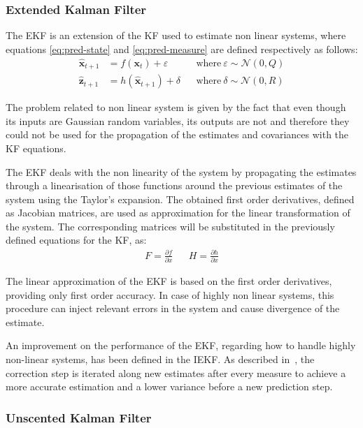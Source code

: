 \subsubsection{Extended Kalman Filter}

\noindent The \gls{EKF} is an extension of the \gls{KF} used to estimate non linear systems, where equations \eqref{eq:pred-state} and \eqref{eq:pred-measure} are defined respectively as follows:
\begin{align}
\hat{\mathbf{x}}_{t+1} & = f(\mathbf{x}_{t}) + \varepsilon &&
    \textrm{where}~\varepsilon \sim \mathcal{N}(0, Q)\\
\hat{\mathbf{z}}_{t+1} & = h(\hat{\mathbf{x}}_{t+1}) + \delta &&
    \textrm{where}~\delta \sim \mathcal{N}(0, R)
\end{align}

The problem related to non linear system is given by the fact that even though its inputs are Gaussian random variables, its outputs are not and therefore they could not be used for the propagation of the estimates and covariances with the \gls{KF} equations.

The \gls{EKF} deals with the non linearity of the system by propagating the estimates through a linearisation of those functions around the previous estimates of the system using the Taylor's expansion\cite{thrun_probabilistic_2005}.
The obtained first order derivatives, defined as Jacobian matrices, are used as approximation for the linear transformation of the system\cite{1386886}.
\newcommand{\partialat}[2]{\frac{\partial {#1}}{\partial {#2}}}
The corresponding matrices will be substituted in the previously defined equations for the \gls{KF}, as:
\begin{align}
F = \partialat{f}{x} & &
H = \partialat{h}{x}
\end{align}

The linear approximation of the \gls{EKF} is based on the first order derivatives, providing only first order accuracy. In case of highly non linear systems, this procedure can inject relevant errors in the system and cause divergence of the estimate.

An improvement on the performance of the \gls{EKF}, regarding how to handle highly non-linear systems, has been defined in the \gls{IEKF}. As described in~\cite{xu_adaptive_2014}, the correction step is iterated along new estimates after every measure to achieve a more accurate estimation and a lower variance before a new prediction step.

\subsubsection{Unscented Kalman Filter}

